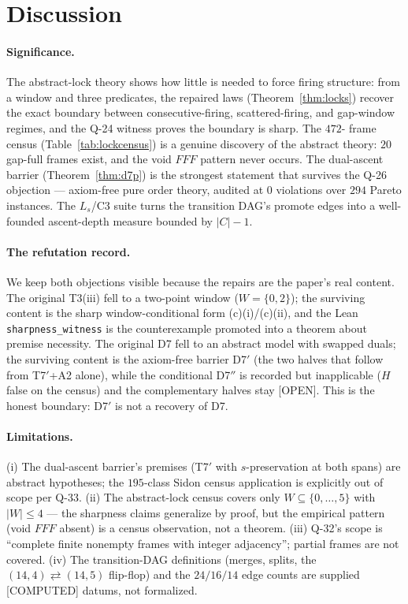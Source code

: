 \documentclass[11pt,a4paper]{article}
\theoremstyle{definition}
\begin{document}
\section{Discussion}

\paragraph{Significance.} The abstract-lock theory shows how little is
needed to force firing structure: from a window and three predicates,
the repaired laws (Theorem~\ref{thm:locks}) recover the exact
boundary between consecutive-firing, scattered-firing, and gap-window
regimes, and the Q-24 witness proves the boundary is sharp. The $472$-
frame census (Table~\ref{tab:lockcensus}) is a genuine discovery of the
abstract theory: $20$ gap-full frames exist, and the void $FFF$ pattern
never occurs. The dual-ascent barrier (Theorem~\ref{thm:d7p}) is the
strongest statement that survives the Q-26 objection --- axiom-free
pure order theory, audited at $0$ violations over $294$ Pareto
instances. The $L_s$/C3 suite turns the transition DAG's promote edges
into a well-founded ascent-depth measure bounded by $|C|-1$.

\paragraph{The refutation record.} We keep both objections visible
because the repairs are the paper's real content. The original T3(iii)
fell to a two-point window ($W=\{0,2\}$); the surviving content is the
sharp window-conditional form (c)(i)/(c)(ii), and the Lean
\texttt{sharpness\_witness} is the counterexample promoted into a
theorem about premise necessity. The original D7 fell to an abstract
model with swapped duals; the surviving content is the axiom-free
barrier D7$'$ (the two halves that follow from T7$'$+A2 alone), while
the conditional D7$''$ is recorded but inapplicable ($H$ false on the
census) and the complementary halves stay [OPEN]. This is the honest
boundary: D7$'$ is not a recovery of D7.

\paragraph{Limitations.} (i) The dual-ascent barrier's premises
(T7$'$ with $s$-preservation at both spans) are abstract hypotheses;
the $195$-class Sidon census application is explicitly out of scope
per Q-33. (ii) The abstract-lock census covers only $W\subseteq
\{0,\dots,5\}$ with $|W|\le4$ --- the sharpness claims generalize by
proof, but the empirical pattern (void $FFF$ absent) is a census
observation, not a theorem. (iii) Q-32's scope is ``complete finite
nonempty frames with integer adjacency''; partial frames are not
covered. (iv) The transition-DAG definitions (merges, splits, the
$(14,4)\rightleftarrows(14,5)$ flip-flop) and the $24/16/14$
edge counts are supplied [COMPUTED] datums, not formalized.
\end{document}

